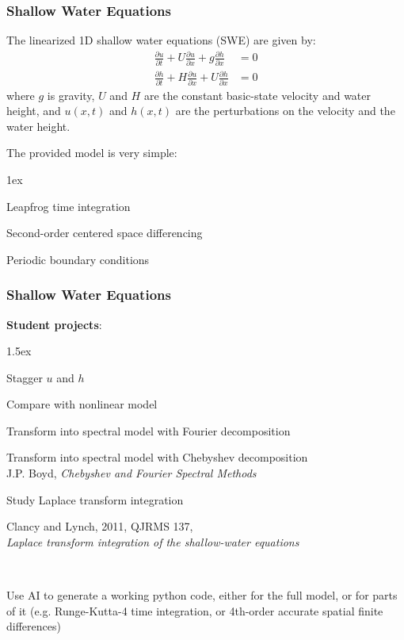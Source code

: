 \documentclass[aspectratio=149,9pt]{beamer}
\begin{document}
\begin{frame}
	\frametitle{Shallow Water Equations}
	\vspace*{-2ex}%
    The linearized 1D shallow water equations (SWE) are given by:
	\begin{align*}
		\frac{\partial u}{\partial t}+U\frac{\partial u}{\partial x}+g\frac{\partial h}{\partial x}&=0\\
		\frac{\partial h}{\partial t}+H\frac{\partial u}{\partial x}+U\frac{\partial h}{\partial x}&=0
	\end{align*}
	where $g$ is gravity, $U$ and $H$ are the constant basic-state velocity and water height, and $u(x,t)$ and $h(x,t)$ are the perturbations on the velocity and the water height.\vspace*{5ex}
    \par
	The provided model is very simple:
	\begin{myitemize}{1ex}
		\item Leapfrog time integration
		\item Second-order centered space differencing
		\item Periodic boundary conditions
	\end{myitemize}
\end{frame}
%
%
\begin{frame}
	\frametitle{Shallow Water Equations}
	{\vspace*{4ex}\bfseries Student projects}:
	\begin{myitemize}{1.5ex}
		\item[1.] Stagger $u$ and $h$
		\item[2.] Compare with nonlinear model
		\item[3.] Transform into spectral model with Fourier decomposition
		\item[4.] Transform into spectral model with Chebyshev decomposition\\[1mm]
			\quad J.P. Boyd, \emph{Chebyshev and Fourier Spectral Methods}\\
		\item[5.] Study Laplace transform integration\\[1mm]
			\quad\parbox{.9\textwidth}{Clancy and Lynch, 2011, QJRMS 137,\\\emph{Laplace transform integration of the shallow-water equations}}\\[1mm]
		\item[6.] Use AI to generate a working python code, either for the full model, or for parts of it (e.g. Runge-Kutta-4 time integration, or 4th-order accurate spatial finite differences)
	\end{myitemize}
\end{frame}
\end{document}
